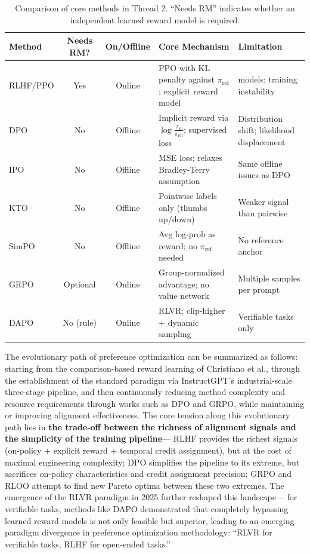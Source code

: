 \begin{table}[!ht]
\centering
\caption{Comparison of core methods in Thread 2. ``Needs RM'' indicates whether an independent learned reward model is required.}
\label{tab:pref-comparison}
\small
\begin{tabularx}{\textwidth}{l c c >{\raggedright\arraybackslash}X >{\raggedright\arraybackslash}X}
\toprule
\textbf{Method} & \textbf{Needs RM?} & \textbf{On/Offline} & \textbf{Core Mechanism} & \textbf{Limitation} \\
\midrule
RLHF/PPO & Yes & Online & PPO with KL penalty against $\pi_{\text{ref}}$; explicit reward model & 4 models; training instability \\
DPO & No & Offline & Implicit reward via $\log \frac{\pi_\theta}{\pi_{\text{ref}}}$; supervised loss & Distribution shift; likelihood displacement \\
IPO & No & Offline & MSE loss; relaxes Bradley-Terry assumption & Same offline issues as DPO \\
KTO & No & Offline & Pointwise labels only (thumbs up/down) & Weaker signal than pairwise \\
SimPO & No & Offline & Avg log-prob as reward; no $\pi_{\text{ref}}$ needed & No reference anchor \\
GRPO & Optional & Online & Group-normalized advantage; no value network & Multiple samples per prompt \\
DAPO & No (rule) & Online & RLVR: clip-higher + dynamic sampling & Verifiable tasks only \\
\bottomrule
\end{tabularx}
\end{table}

The evolutionary path of preference optimization can be summarized as follows:
starting from the comparison-based reward learning of Christiano et al.,
through the establishment of the standard paradigm via InstructGPT's industrial-scale three-stage pipeline,
and then continuously reducing method complexity and resource requirements through works such as DPO and GRPO,
while maintaining or improving alignment effectiveness.
The core tension along this evolutionary path lies in
\textbf{the trade-off between the richness of alignment signals and the simplicity of the training pipeline}---
RLHF provides the richest signals (on-policy + explicit reward + temporal credit assignment),
but at the cost of maximal engineering complexity;
DPO simplifies the pipeline to its extreme, but sacrifices on-policy characteristics and credit assignment precision;
GRPO and RLOO attempt to find new Pareto optima between these two extremes.
The emergence of the RLVR paradigm in 2025 further reshaped this landscape---
for verifiable tasks, methods like DAPO demonstrated that completely bypassing learned reward models
is not only feasible but superior,
leading to an emerging paradigm divergence in preference optimization methodology:
``RLVR for verifiable tasks, RLHF for open-ended tasks.''

